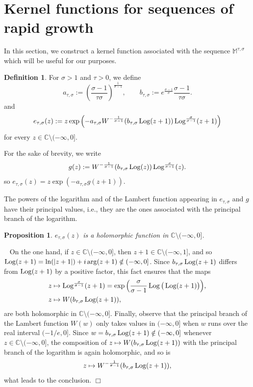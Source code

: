 \documentclass[12pt,leqno]{amsart}
\theoremstyle{plain}
\newtheorem{prop}[theo]{Proposition}
\theoremstyle{definition}
\newtheorem{defi}[theo]{Definition}
\numberwithin{equation}{section}
\def\Log{\mathop{\rm Log}\nolimits}
\def\M{\mathbb{M}}
\newenvironment{proof1}{\medskip\par\noindent{\bf Proof}\ \normalfont}{\hfill $\Box$
\medskip\par}
\begin{document}
\section{Kernel functions for sequences of rapid growth}

In this section, we construct a kernel function associated with the sequence $\M^{\tau,\sigma}$ which will be useful for our purposes.


\begin{defi}\label{defib}
For $\sigma>1$ and $\tau>0$, we define 
\begin{equation}\label{e177}
a_{\tau,\sigma}:= \left(\frac{\sigma-1}{\tau\sigma}\right)^{\frac{1}{\sigma-1}}, \qquad b_{\tau,\sigma}:=e^{\frac{\sigma-1}{\sigma}} \frac{\sigma-1}{\tau\sigma}.
\end{equation}
and 
$$
e_{\tau,\sigma}(z):=z\exp\left( -a_{\tau,\sigma} W^{-\frac{1}{\sigma-1}}(b_{\tau,\sigma}\Log(z+1)) \Log^{\frac{\sigma}{\sigma-1}}(z+1)\right)
$$
for every $z\in\mathbb{C}\setminus(-\infty,0]$. 
\end{defi}

For the sake of brevity, we write
\begin{equation}\label{e351}
 g(z):=W^{-\frac{1}{\sigma-1}}(b_{\tau,\sigma}\Log(z)) \Log^{\frac{\sigma}{\sigma-1}}(z).
\end{equation}
so $e_{\tau,\sigma}(z)=z\exp(-a_{\tau,\sigma}g(z+1))$.




The powers of the logarithm and of the Lambert function appearing in $e_{\tau,\sigma}$ and $g$ have their principal values, i.e., they are the ones associated with the principal branch of the logarithm.

\begin{prop}\label{prop347}
$e_{\tau,\sigma}(z)$ is a holomorphic function in $\mathbb{C}\setminus(-\infty,0]$.
\end{prop}
\begin{proof1}
On the one hand, if $z\in\mathbb{C}\setminus(-\infty,0]$, then $z+1\in\mathbb{C}\setminus(-\infty,1]$, and so
$\Log(z+1)=\ln(|z+1|)+i\arg(z+1)\notin(-\infty,0]$. Since $b_{\tau,\sigma}\Log(z+1)$ differs from $\Log(z+1)$ by a positive factor, this fact ensures that the maps
\begin{align*}
z&\mapsto \Log^{\frac{\sigma}{\sigma-1}}(z+1)= \exp\Big(\frac{\sigma}{\sigma-1}\Log\big(\Log(z+1)\big)\Big),\\
z&\mapsto W(b_{\tau,\sigma}\Log(z+1)),
\end{align*}
are both holomorphic in $\mathbb{C}\setminus(-\infty,0]$. Finally, observe that the principal branch of the Lambert function $W(w)$ only takes values in $(-\infty,0]$ when $w$ runs over the real interval $(-1/e,0]$. Since $w=b_{\tau,\sigma}\Log(z+1)\notin(-\infty,0]$ whenever $z\in\mathbb{C}\setminus(-\infty,0]$, the composition of $z\mapsto W(b_{\tau,\sigma}\Log(z+1))$ with the principal branch of the logarithm is again holomorphic, and so is
$$
z\mapsto W^{-\frac{1}{\sigma-1}}(b_{\tau,\sigma}\Log(z+1)),
$$
what leads to the conclusion.
\end{proof1}
\end{document}
